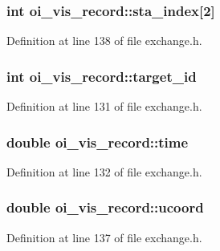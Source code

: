 \hypertarget{structoi__vis__record_ab76303f2bb5b81d4dbb771616de2f531}{
\subsubsection[{sta\_\-index}]{\setlength{\rightskip}{0pt plus 5cm}int {\bf oi\_\-vis\_\-record::sta\_\-index}\mbox{[}2\mbox{]}}}
\label{structoi__vis__record_ab76303f2bb5b81d4dbb771616de2f531}


Definition at line 138 of file exchange.h.

\hypertarget{structoi__vis__record_a6ca9aa550c1df9c5166262e4a55110d1}{
\subsubsection[{target\_\-id}]{\setlength{\rightskip}{0pt plus 5cm}int {\bf oi\_\-vis\_\-record::target\_\-id}}}
\label{structoi__vis__record_a6ca9aa550c1df9c5166262e4a55110d1}


Definition at line 131 of file exchange.h.

\hypertarget{structoi__vis__record_a0d47200b6555926f9145360e5aeb2b1f}{
\subsubsection[{time}]{\setlength{\rightskip}{0pt plus 5cm}double {\bf oi\_\-vis\_\-record::time}}}
\label{structoi__vis__record_a0d47200b6555926f9145360e5aeb2b1f}


Definition at line 132 of file exchange.h.

\hypertarget{structoi__vis__record_a9596a5b78c3a8d06ce8377479fc18f5a}{
\subsubsection[{ucoord}]{\setlength{\rightskip}{0pt plus 5cm}double {\bf oi\_\-vis\_\-record::ucoord}}}
\label{structoi__vis__record_a9596a5b78c3a8d06ce8377479fc18f5a}


Definition at line 137 of file exchange.h.

